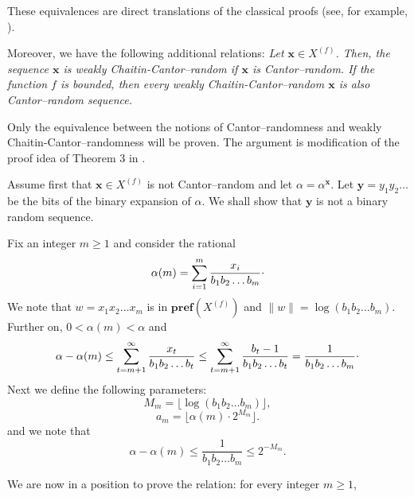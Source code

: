 \documentclass{elsart}
\begin{document}
These equivalences are direct translations of the classical proofs
 (see, for example, \cite{calude:02}).

Moreover, we have the following additional relations:
{\it
Let ${\mathbf x} \in{X^{(f)}}$. Then, the sequence ${\mathbf x}$ is weakly
Chaitin-Cantor--random if ${\mathbf x}$ is Cantor--random.  If the function $f$
is bounded, then every  weakly
Chaitin-Cantor--random ${\mathbf x}$ is also Cantor--random sequence.}

Only the equivalence between the notions of Cantor--randomness
and
weakly Chaitin-Cantor--randomness will be proven.%
The argument  is modification of the proof idea of Theorem 3 in
\cite{ludwig-02}.

 Assume first that ${\mathbf x} \in{X^{(f)}}$ is not Cantor--random and let
$\alpha = \alpha^{{\mathbf x}}$. Let  ${\mathbf y} = y_{1}y_{2}\ldots$ be the bits of the
binary expansion of $\alpha$. We shall show that ${\mathbf y}$ is not a binary random
sequence.

Fix an integer $m\ge 1$ and consider the rational
\[\alpha (m) = \sum_{i=1}^{m} \frac{x_{i}}{b_{1}b_{2}\ldots
b_{m}}{\raisebox{.5ex}{.}}\]
We note that $w=x_{1}x_{2}\ldots x_{m}$ is in ${{\mathbf{pref}({{X^{(f)}}})}}$
and $\parallel w \parallel = \log (b_{1}b_{2}\ldots b_{m})$. Further on,  $0
< \alpha(m) < \alpha$ and
\[\alpha - \alpha(m)   \le  \sum_{t=m+1}^{\infty}
\frac{x_{t}}{b_{1}b_{2}\ldots b_{t}}
  \le  \sum_{t=m+1}^{\infty} \frac{b_{t}-1}{b_{1}b_{2}\ldots b_{t}}
=  \frac{1}{b_{1}b_{2}\ldots b_{m}}{\raisebox{.5ex}{.}}
\]
 Next we define the following parameters:
 \begin{equation}
\label{M}
M_{m} = \lfloor \log (b_{1}b_{2}\ldots b_{m})\rfloor,
\end{equation}
\begin{equation}
\label{a}
a_{m} = \lfloor \alpha(m)\cdot 2^{M_{m}}  \rfloor.
\end{equation}
and we note that
\begin{equation}
\label{cantorerror}
 \alpha - \alpha(m) \le \frac{1}{b_{1}b_{2}\ldots b_{m}} \le 2^{-M_{m}}.
 \end{equation}

We are now in a position to  prove the relation: for every integer $m\ge 1$,
\end{document}
